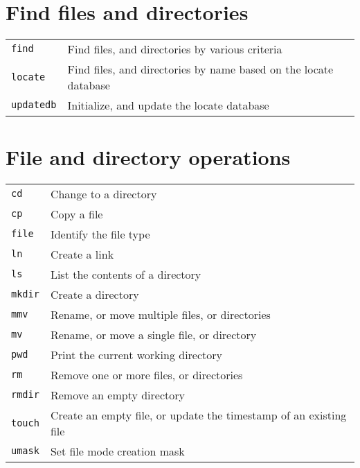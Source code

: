\documentclass[10pt]{article}
\begin{document}
\begin{multicols}{2}
~\\
\vfill

\section{Find files and directories}
\begin{tabular}{ p{2.5cm} p{8.5cm} }
  \hline
  \texttt{find} & Find files, and directories by various criteria \\
  \rowcolor{Gray}
  \texttt{locate} & Find files, and directories by name based on the locate database \\
  \texttt{updatedb} & Initialize, and update the locate database \\
  \hline
\end{tabular}


\columnbreak

\section{File and directory operations}
\begin{tabular}{ p{2.5cm} p{8.5cm} }
  \hline
  \texttt{cd} & Change to a directory \\
  \rowcolor{Gray}
  \texttt{cp} & Copy a file \\
  \texttt{file} & Identify the file type \\
  \rowcolor{Gray}
  \texttt{ln} & Create a link \\
  \texttt{ls} & List the contents of a directory \\
  \rowcolor{Gray}
  \texttt{mkdir} & Create a directory \\
  \texttt{mmv} & Rename, or move multiple files, or directories \\
  \rowcolor{Gray}
  \texttt{mv} & Rename, or move a single file, or directory \\
  \texttt{pwd} & Print the current working directory \\
  \rowcolor{Gray}
  \texttt{rm} & Remove one or more files, or directories \\
  \texttt{rmdir} & Remove an empty directory \\
  \rowcolor{Gray}
  \texttt{touch} & Create an empty file, or update the timestamp of an existing file \\
  \texttt{umask} & Set file mode creation mask \\
  \hline
\end{tabular}

\vfill


\end{multicols}
\end{document}
